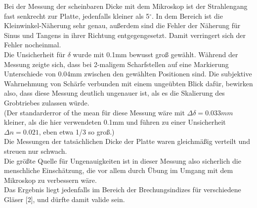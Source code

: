 \documentclass[12pt,a4paper]{article}
\begin{document}
\begin{multicols}{2}
Bei der Messung der scheinbaren Dicke mit dem Mikroskop ist der Strahlengang fast senkrecht zur Platte, jedenfalls kleiner als 5$^\circ$. In dem Bereich ist die Kleinwinkel-Näherung sehr genau, außerdem sind die Fehler der Näherung für Sinus und Tangens in ihrer Richtung entgegengesetzt. Damit verringert sich der Fehler nocheinmal.\\
Die Unsicherheit für $\delta$ wurde mit 0.1mm bewusst groß gewählt. Während der Messung zeigte sich, dass bei 2-maligem Scharfstellen auf eine Markierung Unterschiede von  0.04mm zwischen den gewählten Positionen sind. Die subjektive Wahrnehmung von Schärfe verbunden mit einem ungeübten Blick dafür, bewirken also, dass diese Messung deutlich ungenauer ist, als es die Skalierung des Grobtriebes zulassen würde. \\
(Der standarderror of the mean für diese Messung wäre mit $\Delta \delta = 0.033mm$ kleiner, als die hier verwendeten 0.1mm und führen zu einer Unsicherheit $\Delta n = 0.021$, eben etwa 1/3 so groß.)\\
Die Messungen der tatsächlichen Dicke der Platte waren gleichmäßig verteilt und streuen nur schwach.\\
Die größte Quelle für Ungenauigkeiten ist in dieser Messung also sicherlich die menschliche Einschätzung, die vor allem durch Übung im Umgang mit dem Mikroskop zu verbessern wäre.\\
Das Ergebnis liegt jedenfalls im Bereich der Brechungsindizes für verschiedene Gläser [2], und dürfte damit valide sein.



\end{multicols}
\end{document}
